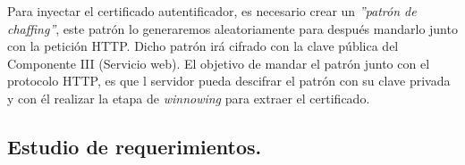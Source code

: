 \documentclass[12pt, a4paper, titlepage]{report}
\begin{document}
		    Para inyectar el certificado autentificador, es necesario crear un \textit{''patrón de chaffing''}, este patrón lo generaremos aleatoriamente para después mandarlo junto con la petición HTTP.
		    Dicho patrón irá cifrado con la clave pública del Componente III (Servicio web). El objetivo de mandar el patrón junto con el protocolo HTTP, es que l servidor pueda descifrar el patrón con su clave privada y con él realizar la etapa de \textit{winnowing} para extraer el certificado.\\
            


			
		    \subsection{Estudio de requerimientos.}
\end{document}
